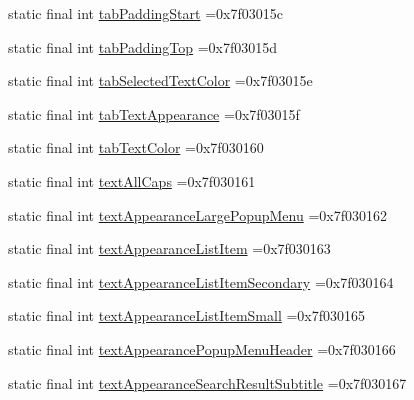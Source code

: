 \begin{DoxyCompactItemize}
\item 
static final int \mbox{\hyperlink{classbr_1_1unb_1_1cic_1_1mp_1_1marketmaster_1_1test_1_1R_1_1attr_a6ac840c5fcda5f3f2a13171bfa41af41}{tab\+Padding\+Start}} =0x7f03015c
\item 
static final int \mbox{\hyperlink{classbr_1_1unb_1_1cic_1_1mp_1_1marketmaster_1_1test_1_1R_1_1attr_a22552ef59966d965336b3709a3ea1355}{tab\+Padding\+Top}} =0x7f03015d
\item 
static final int \mbox{\hyperlink{classbr_1_1unb_1_1cic_1_1mp_1_1marketmaster_1_1test_1_1R_1_1attr_af6dd9dfa879679c87a9e0abd21814608}{tab\+Selected\+Text\+Color}} =0x7f03015e
\item 
static final int \mbox{\hyperlink{classbr_1_1unb_1_1cic_1_1mp_1_1marketmaster_1_1test_1_1R_1_1attr_ae7b30ba8e65b8b22e73f4efe04c33967}{tab\+Text\+Appearance}} =0x7f03015f
\item 
static final int \mbox{\hyperlink{classbr_1_1unb_1_1cic_1_1mp_1_1marketmaster_1_1test_1_1R_1_1attr_adb956a72ffb82a05a9311ffc37221809}{tab\+Text\+Color}} =0x7f030160
\item 
static final int \mbox{\hyperlink{classbr_1_1unb_1_1cic_1_1mp_1_1marketmaster_1_1test_1_1R_1_1attr_a2fffd9820692082ec60772bcfdfaf116}{text\+All\+Caps}} =0x7f030161
\item 
static final int \mbox{\hyperlink{classbr_1_1unb_1_1cic_1_1mp_1_1marketmaster_1_1test_1_1R_1_1attr_a55012aef5fc70f0df045243cc8697c76}{text\+Appearance\+Large\+Popup\+Menu}} =0x7f030162
\item 
static final int \mbox{\hyperlink{classbr_1_1unb_1_1cic_1_1mp_1_1marketmaster_1_1test_1_1R_1_1attr_acca67acb2a1ca8c23deb774fc384c66e}{text\+Appearance\+List\+Item}} =0x7f030163
\item 
static final int \mbox{\hyperlink{classbr_1_1unb_1_1cic_1_1mp_1_1marketmaster_1_1test_1_1R_1_1attr_a0dbce0d458f247326c309d16fada7641}{text\+Appearance\+List\+Item\+Secondary}} =0x7f030164
\item 
static final int \mbox{\hyperlink{classbr_1_1unb_1_1cic_1_1mp_1_1marketmaster_1_1test_1_1R_1_1attr_a1fd02a699df8b33ab9f09efe1f706066}{text\+Appearance\+List\+Item\+Small}} =0x7f030165
\item 
static final int \mbox{\hyperlink{classbr_1_1unb_1_1cic_1_1mp_1_1marketmaster_1_1test_1_1R_1_1attr_a30a041583a46227ff0923209791f987c}{text\+Appearance\+Popup\+Menu\+Header}} =0x7f030166
\item 
static final int \mbox{\hyperlink{classbr_1_1unb_1_1cic_1_1mp_1_1marketmaster_1_1test_1_1R_1_1attr_a3999b9918abbd3716b84cf48e518b003}{text\+Appearance\+Search\+Result\+Subtitle}} =0x7f030167

\end{DoxyCompactItemize}
